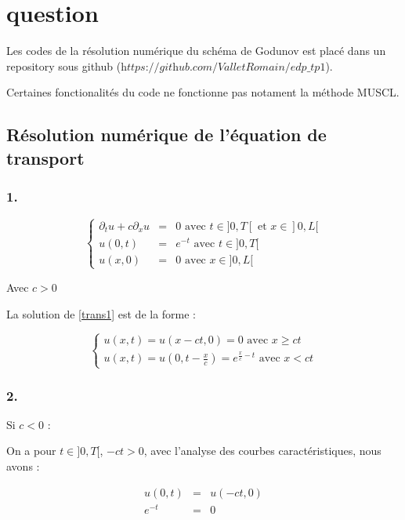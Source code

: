 \documentclass{article}
\begin{document}
\section{question}

Les codes de la résolution numérique du schéma de Godunov est placé dans un repository sous github ($\textit{https://github.com/ValletRomain/edp\_tp1}$).

Certaines fonctionalités du code ne fonctionne pas notament la méthode MUSCL.

\subsection{Résolution numérique de l’équation de transport}

\subsubsection*{1.}

\[ \left\{ \begin{matrix}
\partial_t u + c \partial_x u &=& 0 \text{ avec } t \in ]0,T[ \text{ et } x \in ]0,L[  \\
u(0,t) &=& e^{-t} \text{ avec } t \in ]0,T[ \\
u(x,0) &=& 0 \text{ avec } x \in ]0,L[
\end{matrix} \right.
\label{trans1} \tag{Transport1} \]

Avec $c>0$
\newline

La solution de \ref{trans1} est de la forme :

\[
\left\{
\begin{array}{ll}
    u(x,t) = u(x-ct,0) = 0 \text{ avec } x \geq ct \\
    u(x,t) = u(0,t-\frac{x}{c}) = e^{\frac{x}{c}-t} \text{ avec } x < ct
\end{array}
\right.
\tag{Sol1}
\]

\subsubsection*{2.}

Si $c < 0$ :

On a pour $t \in ]0,T[$, $-ct>0$, avec l'analyse des courbes caractéristiques, nous avons :

\begin{eqnarray*}
u(0,t) &=& u(-ct,0) \\
e^{-t} &=& 0
\end{eqnarray*}
\end{document}
